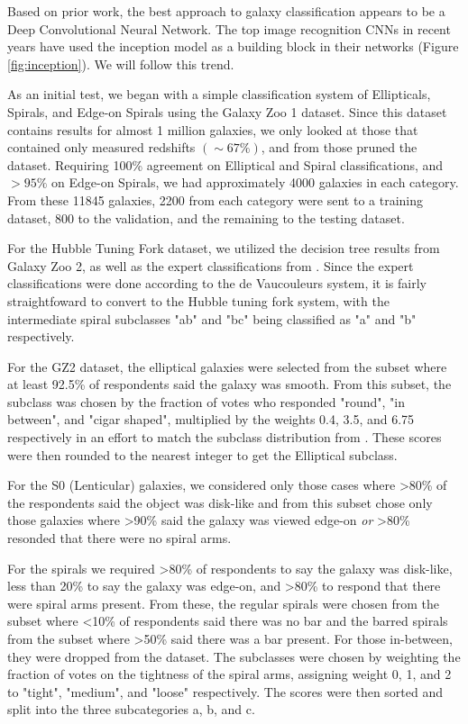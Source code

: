 \documentclass{article}
\begin{document}
Based on prior work, the best approach to galaxy classification appears to be a Deep Convolutional Neural Network. The top image recognition CNNs in recent years have used the inception model \citep{2014arXiv1409.4842S} as a building block in their networks (Figure \ref{fig:inception}). We will follow this trend.

As an initial test, we began with a simple classification system of Ellipticals, Spirals, and Edge-on Spirals using the Galaxy Zoo 1 dataset. Since this dataset contains results for almost 1 million galaxies, we only looked at those that contained only measured redshifts $(\sim 67\%)$, and from those pruned the dataset. Requiring 100\% agreement on Elliptical and Spiral classifications, and $>95\%$ on Edge-on Spirals, we had approximately 4000 galaxies in each category. From these 11845 galaxies, 2200 from each category were sent to a training dataset, 800 to the validation, and the remaining to the testing dataset.

For the Hubble Tuning Fork dataset, we utilized the decision tree results from Galaxy Zoo 2, as well as the expert classifications from \cite{2010ApJS..186..427N}. Since the expert classifications were done according to the de Vaucouleurs system, it is fairly straightfoward to convert to the Hubble tuning fork system, with the intermediate spiral subclasses "ab" and "bc" being classified as "a" and "b" respectively. 

For the GZ2 dataset, the elliptical galaxies were selected from the subset where at least 92.5\% of respondents said the galaxy was smooth. From this subset, the subclass was chosen by the fraction of votes who responded "round", "in between", and "cigar shaped", multiplied by the weights 0.4, 3.5, and 6.75 respectively in an effort to match the subclass distribution from \cite{2010ApJS..186..427N}. These scores were then rounded to the nearest integer to get the Elliptical subclass.

For the S0 (Lenticular) galaxies, we considered only those cases where >80\% of the respondents said the object was disk-like and from this subset chose only those galaxies where >90\% said the galaxy was viewed edge-on \emph{or} >80\% resonded that there were no spiral arms.

For the spirals we required >80\% of respondents to say the galaxy was disk-like, less than 20\% to say the galaxy was edge-on, and >80\% to respond that there were spiral arms present. From these, the regular spirals were chosen from the subset where <10\% of respondents said there was no bar and the barred spirals from the subset where >50\% said there was a bar present. For those in-between, they were dropped from the dataset. The subclasses were chosen by weighting the fraction of votes on the tightness of the spiral arms, assigning weight 0, 1, and 2 to "tight", "medium", and "loose" respectively. The scores were then sorted and split into the three subcategories a, b, and c.
\end{document}
